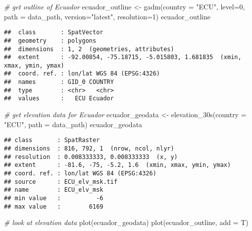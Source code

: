 \documentclass[
]{article}
\newenvironment{Shaded}{\begin{snugshade}}{\end{snugshade}}
\newcommand{\AttributeTok}[1]{\textcolor[rgb]{0.77,0.63,0.00}{#1}}
\newcommand{\CommentTok}[1]{\textcolor[rgb]{0.56,0.35,0.01}{\textit{#1}}}
\newcommand{\DecValTok}[1]{\textcolor[rgb]{0.00,0.00,0.81}{#1}}
\newcommand{\FunctionTok}[1]{\textcolor[rgb]{0.00,0.00,0.00}{#1}}
\newcommand{\NormalTok}[1]{#1}
\newcommand{\OtherTok}[1]{\textcolor[rgb]{0.56,0.35,0.01}{#1}}
\newcommand{\StringTok}[1]{\textcolor[rgb]{0.31,0.60,0.02}{#1}}
\begin{document}
\begin{Shaded}
\begin{Highlighting}[]
\CommentTok{\# get outline of Ecuador}
\NormalTok{ecuador\_outline }\OtherTok{\textless{}{-}} \FunctionTok{gadm}\NormalTok{(}\AttributeTok{country =} \StringTok{"ECU"}\NormalTok{, }\AttributeTok{level=}\DecValTok{0}\NormalTok{, }\AttributeTok{path =}\NormalTok{ data\_path, }\AttributeTok{version=}\StringTok{"latest"}\NormalTok{, }\AttributeTok{resolution=}\DecValTok{1}\NormalTok{)}
\NormalTok{ecuador\_outline}
\end{Highlighting}
\end{Shaded}

\begin{verbatim}
##  class       : SpatVector 
##  geometry    : polygons 
##  dimensions  : 1, 2  (geometries, attributes)
##  extent      : -92.00854, -75.18715, -5.015803, 1.681835  (xmin, xmax, ymin, ymax)
##  coord. ref. : lon/lat WGS 84 (EPSG:4326) 
##  names       : GID_0 COUNTRY
##  type        : <chr>   <chr>
##  values      :   ECU Ecuador
\end{verbatim}

\begin{Shaded}
\begin{Highlighting}[]
\CommentTok{\# get elevation data for Ecuador}
\NormalTok{ecuador\_geodata }\OtherTok{\textless{}{-}} \FunctionTok{elevation\_30s}\NormalTok{(}\AttributeTok{country =} \StringTok{"ECU"}\NormalTok{, }\AttributeTok{path =}\NormalTok{ data\_path)}
\NormalTok{ecuador\_geodata}
\end{Highlighting}
\end{Shaded}

\begin{verbatim}
## class       : SpatRaster 
## dimensions  : 816, 792, 1  (nrow, ncol, nlyr)
## resolution  : 0.008333333, 0.008333333  (x, y)
## extent      : -81.6, -75, -5.2, 1.6  (xmin, xmax, ymin, ymax)
## coord. ref. : lon/lat WGS 84 (EPSG:4326) 
## source      : ECU_elv_msk.tif 
## name        : ECU_elv_msk 
## min value   :          -6 
## max value   :        6169
\end{verbatim}

\begin{Shaded}
\begin{Highlighting}[]
\CommentTok{\# look at elevation data}
\FunctionTok{plot}\NormalTok{(ecuador\_geodata)}
\FunctionTok{plot}\NormalTok{(ecuador\_outline, }\AttributeTok{add =}\NormalTok{ T)}
\end{Highlighting}
\end{Shaded}
\end{document}
